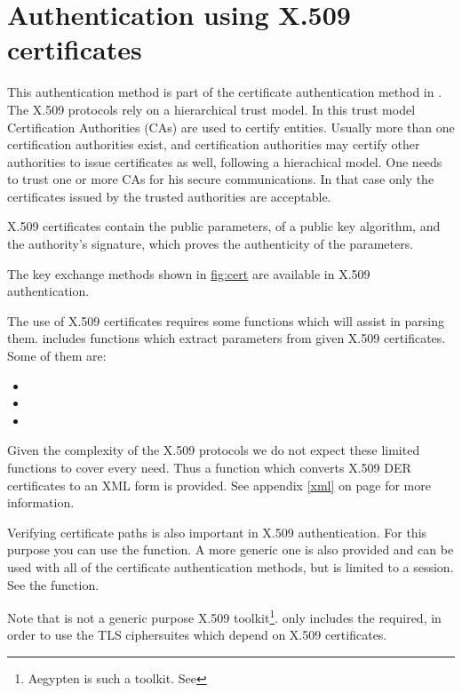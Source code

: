 \section{Authentication using X.509 certificates}

This authentication method is part of the certificate authentication
method in \gnutls{}.
The X.509 protocols rely on a hierarchical trust model. In this trust model
Certification Authorities (CAs) are used to certify entities.
Usually more than one certification authorities exist, and certification
authorities may certify other authorities to issue certificates as well,
following a hierachical model. 
One needs to trust one or more CAs for his secure
communications. In that case only the certificates issued by the trusted
authorities are acceptable. 
\par
X.509 certificates contain the public parameters, 
of a public key algorithm, and the authority's signature, which proves the
authenticity of the parameters.
\par
The key exchange methods shown in \hyperref{figure}{figure }{}{fig:cert} are
available in X.509 authentication. 

\par The use of X.509 certificates requires some functions which will 
assist in parsing them. \gnutls{} includes functions which extract 
parameters from given X.509 certificates. Some of them are:
\begin{itemize}
\item {}
\item {}
\item {}
\end{itemize}

Given the complexity of the X.509 protocols we do not expect these limited 
functions to cover every need. Thus a function which converts X.509 DER certificates
to an XML form is provided. See appendix \ref{xml} on page \pageref{xml} for
more information.

\par
Verifying certificate paths is also important in X.509 authentication.
For this purpose you can use the
function. A more generic one is also provided and can be used with all
of the certificate authentication methods, but is limited to a session. See the
function.

\par
Note that \gnutls{} is not a generic purpose X.509 toolkit\footnote{Aegypten is such a toolkit. See 
}. 
\gnutls{} only includes the required,
in order to use the TLS ciphersuites which depend on X.509 certificates.


